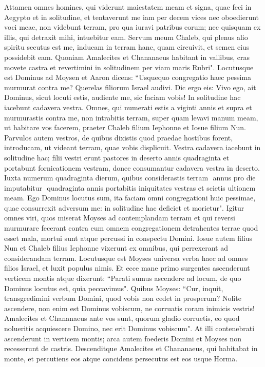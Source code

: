 \begin{biblechapter}
\verse Attamen omnes homines, qui viderunt maiestatem meam et signa, quae feci in Aegypto et in solitudine, et tentaverunt me iam per decem vices nec oboedierunt voci meae, 
\verse non videbunt terram, pro qua iuravi patribus eorum; nec quisquam ex illis, qui detraxit mihi, intuebitur eam. 
\verse Servum meum Chaleb, qui plenus alio spiritu secutus est me, inducam in terram hanc, quam circuivit, et semen eius possidebit eam. 
\verse Quoniam Amalecites et Chananaeus habitant in vallibus, cras movete castra et revertimini in solitudinem per viam maris Rubri". 
\verse Locutusque est Dominus ad Moysen et Aaron dicens: 
\verse “Usquequo congregatio haec pessima murmurat contra me? Querelas filiorum Israel audivi.  
\verse Dic ergo eis: Vivo ego, ait Dominus, sicut locuti estis, audiente me, sic faciam vobis! 
\verse In solitudine hac iacebunt cadavera vestra. Omnes, qui numerati estis a viginti annis et supra et murmurastis contra me, 
\verse non intrabitis terram, super quam levavi manum meam, ut habitare vos facerem, praeter Chaleb filium Iephonne et Iosue filium Nun. 
\verse Parvulos autem vestros, de quibus dixistis quod praedae hostibus forent, introducam, ut videant terram, quae vobis displicuit. 
\verse Vestra cadavera iacebunt in solitudine hac; 
\verse filii vestri erunt pastores in deserto annis quadraginta et portabunt fornicationem vestram, donec consumantur cadavera vestra in deserto. 
\verse Iuxta numerum quadraginta dierum, quibus considerastis terram ­ annus pro die imputabitur ­ quadraginta annis portabitis iniquitates vestras et scietis ultionem meam.  
\verse Ego Dominus locutus sum, ita faciam omni congregationi huic pessimae, quae consurrexit adversum me: in solitudine hac deficiet et morietur". 
\verse Igitur omnes viri, quos miserat Moyses ad contemplandam terram et qui reversi murmurare fecerant contra eum omnem congregationem detrahentes terrae quod esset mala, 
\verse mortui sunt atque percussi in conspectu Domini. 
\verse Iosue autem filius Nun et Chaleb filius Iephonne vixerunt ex omnibus, qui perrexerant ad considerandam terram. 
\verse Locutusque est Moyses universa verba haec ad omnes filios Israel, et luxit populus nimis. 
\verse Et ecce mane primo surgentes ascenderunt verticem montis atque dixerunt: “Parati sumus ascendere ad locum, de quo Dominus locutus est, quia peccavimus". 
\verse Quibus Moyses: “Cur, inquit, transgredimini verbum Domini, quod vobis non cedet in prosperum? 
\verse Nolite ascendere, non enim est Dominus vobiscum, ne corruatis coram inimicis vestris! 
\verse Amalecites et Chananaeus ante vos sunt, quorum gladio corruetis, eo quod nolueritis acquiescere Domino, nec erit Dominus vobiscum". 
\verse At illi contenebrati ascenderunt in verticem montis; arca autem foederis Domini et Moyses non recesserunt de castris. 
\verse Descenditque Amalecites et Chananaeus, qui habitabat in monte, et percutiens eos atque concidens persecutus est eos usque Horma. 
\end{biblechapter}


